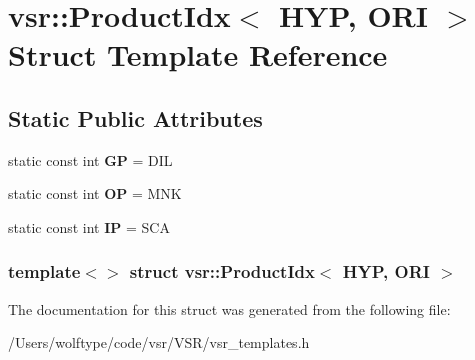 \hypertarget{structvsr_1_1_product_idx_3_01_h_y_p_00_01_o_r_i_01_4}{\section{vsr\-:\-:Product\-Idx$<$ H\-Y\-P, O\-R\-I $>$ Struct Template Reference}
\label{structvsr_1_1_product_idx_3_01_h_y_p_00_01_o_r_i_01_4}
}
\subsection*{Static Public Attributes}
\begin{DoxyCompactItemize}
\item 
\hypertarget{structvsr_1_1_product_idx_3_01_h_y_p_00_01_o_r_i_01_4_acae2d9509d09bcb8382164109c3db097}{static const int {\bfseries G\-P} = D\-I\-L}\label{structvsr_1_1_product_idx_3_01_h_y_p_00_01_o_r_i_01_4_acae2d9509d09bcb8382164109c3db097}

\item 
\hypertarget{structvsr_1_1_product_idx_3_01_h_y_p_00_01_o_r_i_01_4_a8145b51c1aa855f454f78ab9d375e140}{static const int {\bfseries O\-P} = M\-N\-K}\label{structvsr_1_1_product_idx_3_01_h_y_p_00_01_o_r_i_01_4_a8145b51c1aa855f454f78ab9d375e140}

\item 
\hypertarget{structvsr_1_1_product_idx_3_01_h_y_p_00_01_o_r_i_01_4_aa41a48b2f8e8d4935ec3a825e0bf3453}{static const int {\bfseries I\-P} = S\-C\-A}\label{structvsr_1_1_product_idx_3_01_h_y_p_00_01_o_r_i_01_4_aa41a48b2f8e8d4935ec3a825e0bf3453}

\end{DoxyCompactItemize}
\subsubsection*{template$<$$>$ struct vsr\-::\-Product\-Idx$<$ H\-Y\-P, O\-R\-I $>$}



The documentation for this struct was generated from the following file\-:\begin{DoxyCompactItemize}
\item 
/\-Users/wolftype/code/vsr/\-V\-S\-R/vsr\-\_\-templates.\-h\end{DoxyCompactItemize}
